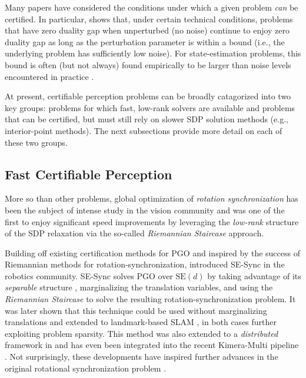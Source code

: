 \documentclass[lettersize,journal]{IEEEtran}
\begin{document}
Many papers have considered the conditions under which a given problem \emph{can} be certified. In particular, \cite{cifuentesLocalStabilitySemidefinite2022} shows that, under certain technical conditions, problems that have zero duality gap when unperturbed (no noise) continue to enjoy zero duality gap as long as the perturbation parameter is within a bound (i.e., the underlying problem has sufficiently low noise). For state-estimation problems, this bound is often (but not always) found empirically to be larger than noise levels encountered in practice \cite{rosenSESyncCertifiablyCorrect2019, tianDistributedCertifiablyCorrect2021, erikssonRotationAveragingStrong2018}.

At present, certifiable perception problems can be broadly catagorized into two key groups: problems for which fast, low-rank solvers are available and problems that can be certified, but must still rely on slower SDP solution methods (e.g., interior-point methods). The next subsections provide more detail on each of these two groups.

\subsection{Fast Certifiable Perception}\label{sec:FastPerception}

More so than other problems, global optimization of \emph{rotation synchronization} has been the subject of intense study in the vision community \cite{wilsonWhenRotationsAveraging2016, erikssonRotationAveragingStrong2018, brynteTightnessSemidefiniteRelaxations2022} and was one of the first to enjoy significant speed improvements by leveraging the \emph{low-rank} structure of the SDP relaxation via the so-called \emph{Riemannian Staircase} approach\cite{bandeiraTightnessMaximumLikelihood2017, boumalNonconvexBurerMonteiro2016}. 

Building off existing certification methods for PGO \cite{carloneLagrangianDuality3D2015} and inspired by the success of Riemannian methods for rotation-synchronization, \cite{rosenSESyncCertifiablyCorrect2019} introduced SE-Sync in the robotics community. SE-Sync solves PGO over $\mbox{SE}(d)$ by taking advantage of its \emph{separable} structure \cite{khosoussiSparseSeparableSLAM2016}, marginalizing the translation variables, and using the \emph{Riemannian Staircase} to solve the resulting rotation-synchronization problem. It was later shown that this technique could be used without marginalizing translations \cite{brialesCartanSyncFastGlobal2017} and extended to landmark-based SLAM \cite{holmesEfficientGlobalOptimality2023}, in both cases further exploiting problem sparsity. This method was also extended to a \emph{distributed} framework in \cite{tianDistributedCertifiablyCorrect2021} and has even been integrated into the recent Kimera-Multi pipeline \cite{tianKimeraMultiRobustDistributed2022}. Not surprisingly, these developments have inspired further advances in the original rotational synchronization problem \cite{dellaertShonanRotationAveraging2020}. 
\end{document}
